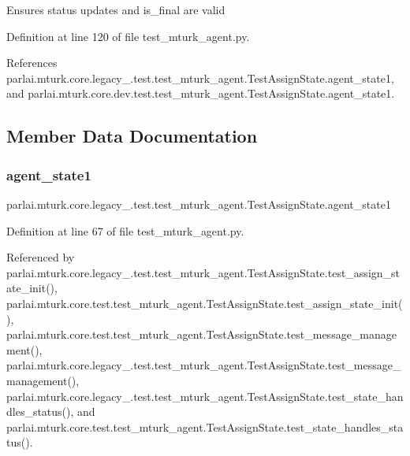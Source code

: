 \begin{DoxyVerb}Ensures status updates and is_final are valid\end{DoxyVerb}
 

Definition at line 120 of file test\+\_\+mturk\+\_\+agent.\+py.



References parlai.\+mturk.\+core.\+legacy\+\_.\+test.\+test\+\_\+mturk\+\_\+agent.\+Test\+Assign\+State.\+agent\+\_\+state1, and parlai.\+mturk.\+core.\+dev.\+test.\+test\+\_\+mturk\+\_\+agent.\+Test\+Assign\+State.\+agent\+\_\+state1.



\subsection{Member Data Documentation}
\mbox{\label{classparlai_1_1mturk_1_1core_1_1legacy__2018_1_1test_1_1test__mturk__agent_1_1TestAssignState_a9ae9349ff6a25e0876453d85256bd643}} 
\subsubsection{\texorpdfstring{agent\+\_\+state1}{agent\_state1}}
{\footnotesize\ttfamily parlai.\+mturk.\+core.\+legacy\+\_.\+test.\+test\+\_\+mturk\+\_\+agent.\+Test\+Assign\+State.\+agent\+\_\+state1}



Definition at line 67 of file test\+\_\+mturk\+\_\+agent.\+py.



Referenced by parlai.\+mturk.\+core.\+legacy\+\_.\+test.\+test\+\_\+mturk\+\_\+agent.\+Test\+Assign\+State.\+test\+\_\+assign\+\_\+state\+\_\+init(), parlai.\+mturk.\+core.\+test.\+test\+\_\+mturk\+\_\+agent.\+Test\+Assign\+State.\+test\+\_\+assign\+\_\+state\+\_\+init(), parlai.\+mturk.\+core.\+test.\+test\+\_\+mturk\+\_\+agent.\+Test\+Assign\+State.\+test\+\_\+message\+\_\+management(), parlai.\+mturk.\+core.\+legacy\+\_.\+test.\+test\+\_\+mturk\+\_\+agent.\+Test\+Assign\+State.\+test\+\_\+message\+\_\+management(), parlai.\+mturk.\+core.\+legacy\+\_.\+test.\+test\+\_\+mturk\+\_\+agent.\+Test\+Assign\+State.\+test\+\_\+state\+\_\+handles\+\_\+status(), and parlai.\+mturk.\+core.\+test.\+test\+\_\+mturk\+\_\+agent.\+Test\+Assign\+State.\+test\+\_\+state\+\_\+handles\+\_\+status().

